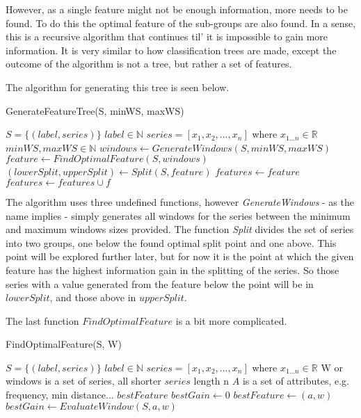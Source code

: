 \documentclass[10pt]{article}
\begin{document}
However, as a single feature might not be enough information, more needs to be found. To do this the optimal feature of the sub-groups are also found. In a sense, this is a recursive algorithm that continues til' it is impossible to gain more information. It is very similar to how classification trees are made, except the outcome of the algorithm is not a tree, but rather a set of features.

\newpage
The algorithm for generating this tree is seen below.

\begin{algorithm}
\caption{GenerateFeatureTree(S, minWS, maxWS)}\label{alg:feature_tree}
\begin{algorithmic}
\Require $S = \{(label, series)\}$
\Require $label \in \mathbb{N}$
\Require $series = [x_1, x_2, ..., x_n]$ where $x_{1 ... n} \in \mathbb{R}$
\Require $minWS, maxWS \in \mathbb{N}$ 
\State $windows \gets GenerateWindows(S, minWS, maxWS)$
\State $feature \gets FindOptimalFeature(S, windows)$
\State $(lowerSplit, upperSplit) \gets Split(S, feature)$
\State $features \gets feature$
	\State $features \gets features \cup f$
\EndFor

\end{algorithmic}
\end{algorithm}

The algorithm uses three undefined functions, however \textit{GenerateWindows} - as the name implies - simply generates all windows for the series between the minimum and maximum windows sizes provided. The function \textit{Split} divides the set of series into two groups, one below the found optimal split point and one above. This point will be explored further later, but for now it is the point at which the given feature has the highest information gain in the splitting of the series. So those series with a value generated from the feature below the point will be in $lowerSplit$, and those above in $upperSplit$.

The last function $FindOptimalFeature$ is a bit more complicated.

\begin{algorithm}
\caption{FindOptimalFeature(S, W)}\label{alg:feature_scaling}
\begin{algorithmic}
\Require $S = \{(label, series)\}$
\Require $label \in \mathbb{N}$
\Require $series = [x_1, x_2, ..., x_n]$ where $x_{1 ... n} \in \mathbb{R}$
\Require W or windows is a set of series, all shorter $series$ length n
\State $A$ is a set of attributes, e.g. frequency, min distance...
\State $bestFeature$
\State $bestGain \gets 0$
			\State $bestFeature \gets (a, w)$
			\State$bestGain \gets EvaluateWindow(S, a, w)$
		\EndIf
	\EndFor
\EndFor

\end{algorithmic}
\end{algorithm}
\end{document}
